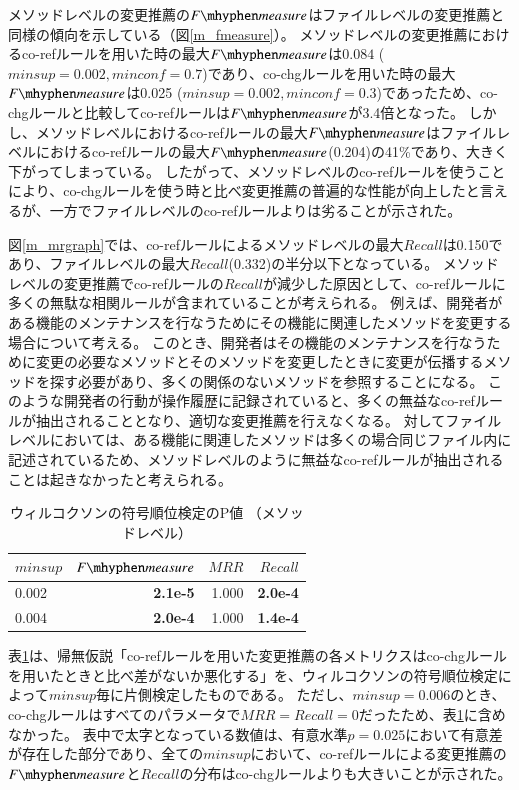 \documentclass[a4paper]{jsbook}
\newcommand{\minconf}{mincon\!f}
\newcommand{\fmeasure}{F\mhyphen measure}
\begin{document}
メソッドレベルの変更推薦の$\fmeasure$はファイルレベルの変更推薦と同様の傾向を示している（図\ref{m_fmeasure}）。
メソッドレベルの変更推薦におけるco-refルールを用いた時の最大$\fmeasure$は$0.084$ ($minsup=0.002,\minconf=0.7$)であり、co-chgルールを用いた時の最大$\fmeasure$は0.025 ($minsup=0.002,\minconf=0.3$)であったため、co-chgルールと比較してco-refルールは$\fmeasure$が3.4倍となった。
しかし、メソッドレベルにおけるco-refルールの最大$\fmeasure$はファイルレベルにおけるco-refルールの最大$\fmeasure$(0.204)の41\%であり、大きく下がってしまっている。
したがって、メソッドレベルのco-refルールを使うことにより、co-chgルールを使う時と比べ変更推薦の普遍的な性能が向上したと言えるが、一方でファイルレベルのco-refルールよりは劣ることが示された。

図\ref{m_mrgraph}では、co-refルールによるメソッドレベルの最大$Recall$は0.150であり、ファイルレベルの最大$Recall$(0.332)の半分以下となっている。
メソッドレベルの変更推薦でco-refルールの$Recall$が減少した原因として、co-refルールに多くの無駄な相関ルールが含まれていることが考えられる。
例えば、開発者がある機能のメンテナンスを行なうためにその機能に関連したメソッドを変更する場合について考える。
このとき、開発者はその機能のメンテナンスを行なうために変更の必要なメソッドとそのメソッドを変更したときに変更が伝播するメソッドを探す必要があり、多くの関係のないメソッドを参照することになる。
このような開発者の行動が操作履歴に記録されていると、多くの無益なco-refルールが抽出されることとなり、適切な変更推薦を行えなくなる。
対してファイルレベルにおいては、ある機能に関連したメソッドは多くの場合同じファイル内に記述されているため、メソッドレベルのように無益なco-refルールが抽出されることは起きなかったと考えられる。

\begin{table}[t]
  \begin{center}
    \caption{ウィルコクソンの符号順位検定のP値 （メソッドレベル）}
    \label{pvalue_method}
    \begin{tabular}{l|rrr}
      \hline
      $minsup$ & $\fmeasure$ & $MRR$ & $Recall$\\
      \hline
      0.002 & {\bf 2.1e-5} & 1.000 & {\bf 2.0e-4}\\
      0.004 & {\bf 2.0e-4} & 1.000 & {\bf 1.4e-4}\\
      \hline
    \end{tabular}
  \end{center}
\end{table}

表\ref{pvalue_method}は、帰無仮説「co-refルールを用いた変更推薦の各メトリクスはco-chgルールを用いたときと比べ差がないか悪化する」を、ウィルコクソンの符号順位検定によって$minsup$毎に片側検定したものである。
ただし、$minsup=0.006$のとき、co-chgルールはすべてのパラメータで$MRR=Recall=0$だったため、表\ref{pvalue_method}に含めなかった。
表中で太字となっている数値は、有意水準$p=0.025$において有意差が存在した部分であり、全ての$minsup$において、co-refルールによる変更推薦の$\fmeasure$と$Recall$の分布はco-chgルールよりも大きいことが示された。
\end{document}
